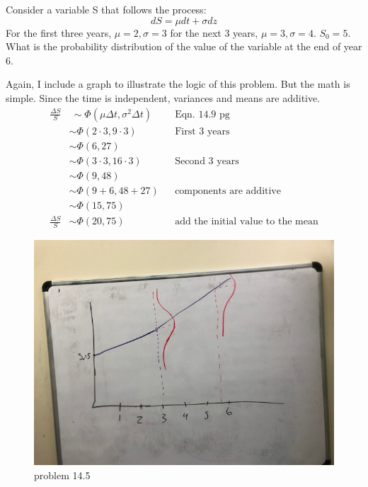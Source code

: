 \documentclass[12pt]{article}
\newenvironment{problem}[3][Problem]{\begin{trivlist}
\item[\hskip \labelsep {\bfseries #1}\hskip \labelsep {\bfseries #2.}]}{\end{trivlist}}
\begin{document}
\begin{problem}{14.5}. Consider a variable S that follows the process: $$dS = \mu dt + \sigma dz$$
For the first three years, $\mu = 2, \sigma = 3$ for the next 3 years, $\mu = 3, \sigma = 4$. $S_0=5$. What is the probability distribution of the value of the variable at the end of year 6. 

Again, I include a graph to illustrate the logic of this problem. But the math is simple. Since the time is independent, variances and means are additive. 
\begin{align*}
\frac{\Delta S}{S} & ~\sim \Phi (\mu \Delta t , \sigma^2 \Delta t) && \text{Eqn. 14.9 pg} \\
 & \sim \Phi (2 \cdot 3 , 9 \cdot 3) && \text{First 3 years} \\
 & \sim \Phi (6 , 27) \\
 & \sim \Phi (3 \cdot 3 , 16 \cdot 3) && \text{Second 3 years} \\
 & \sim \Phi (9 , 48) \\
& \sim \Phi (9+6 , 48+27)  && \text{components are additive} \\
 & \sim \Phi (15 , 75) \\
\frac{\Delta S}{S}  & \sim \Phi (20 , 75) && \text{add the initial value to the mean}
\end{align*}
\begin{figure}
\includegraphics[width=\linewidth]{mod10_p5.png}
\caption{problem 14.5}
\end{figure}
\end{problem}
\end{document}
